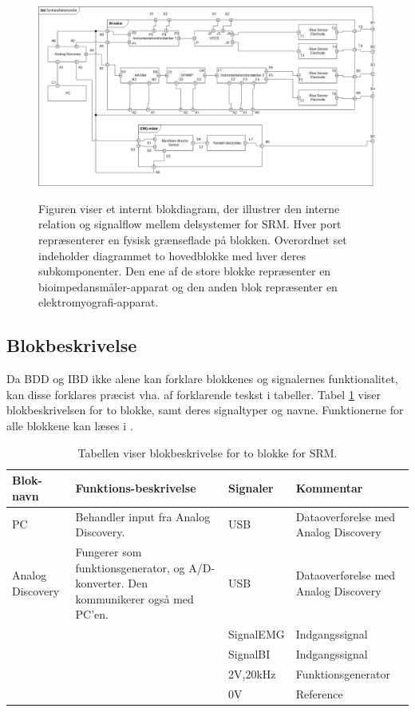\begin{figure}[H]
\centering
{\includegraphics[width=\linewidth]
{Figure/IBD}}
\caption{Figuren viser et internt blokdiagram, der illustrer den interne relation og signalflow mellem delsystemer for SRM. Hver port repræsenterer en fysisk grænseflade på blokken. Overordnet set indeholder diagrammet to hovedblokke med hver deres subkomponenter. Den ene af de store blokke repræsenter en bioimpedansmåler-apparat og den anden blok repræsenter en elektromyografi-apparat.}
\label{fig:ibdfigur}
\end{figure}


\subsection{Blokbeskrivelse}

Da BDD og IBD ikke alene kan forklare blokkenes og signalernes funktionalitet, kan disse forklares præcist vha. af forklarende teskst i tabeller. Tabel \ref{tab:BlokBeskr} viser blokbeskrivelsen for to blokke, samt deres signaltyper og navne. Funktionerne for alle blokkene kan læses i  .


\begin{table}[H]
\centering
\begin{tabularx}{\textwidth}{l|X|X|X}
\hline
\textbf{Blok-navn}                        & \textbf{Funktions-beskrivelse}  & \textbf{Signaler} & \textbf{Kommentar} \\  \hline

PC & Behandler input fra Analog Discovery.  &  USB & Dataoverførelse med Analog Discovery   \\ \cline{3-4} \hline


Analog Discovery & Fungerer som funktionsgenerator, og  A/D-konverter. Den kommunikerer også med PC'en.  &  USB & Dataoverførelse med Analog Discovery   \\ \cline{3-4}

 	 
 	 &  & SignalEMG & Indgangssignal  \\ \cline{3-4}
 	 
 	 &  & SignalBI & Indgangssignal  \\ \cline{3-4}
 	 &  & $   ${2V,20kHz} & Funktionsgenerator  \\ \cline{3-4}
 	 &  & $   ${0V} & Reference  \\ \cline{3-4} \hline
 	 
\end{tabularx}
\caption{Tabellen viser blokbeskrivelse for to blokke for SRM.} 
\label{tab:BlokBeskr}
\end{table}



